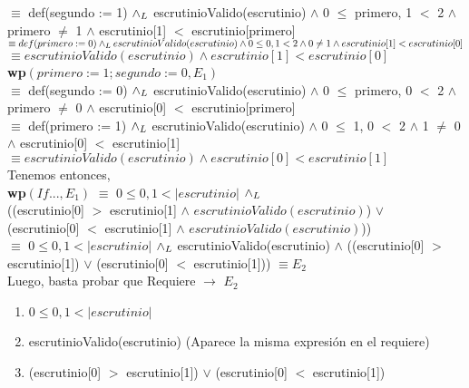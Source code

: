\documentclass[10pt,a4paper]{article}
\begin{document}
\noindent $\equiv$ def(segundo := 1) $\land _L$ escrutinioValido(escrutinio) $\land$ 0 $\leq$ primero, 1 $<$ 2 $\land$ primero $\neq$ 1 $\land$ escrutinio[1] $<$ escrutinio[primero] \\
\noindent $\equiv def(primero := 0) \land _L escrutinioValido(escrutinio) \land 0 \leq 0, 1 < 2 \land 0 \neq 1 \land escrutinio[1] < escrutinio[0] $ \\
\noindent $\equiv escrutinioValido(escrutinio) \land escrutinio[1] < escrutinio[0] $ \\

 \noindent \textbf{wp$(primero := 1; segundo := 0, E_1)$} \vspace{0.1cm} \\

\noindent $\equiv$ def(segundo := 0) $\land _L$ escrutinioValido(escrutinio) $\land$ 0 $\leq$ primero, 0 $<$ 2 $\land$ primero $\neq$ 0 $\land$ escrutinio[0] $<$ escrutinio[primero] \\
\noindent $\equiv$ def(primero := 1) $\land _L$ escrutinioValido(escrutinio) $\land$ 0 $\leq$ 1, 0 $<$ 2 $\land$ 1 $\neq$ 0 $\land$ escrutinio[0] $<$ escrutinio[1]  \\
\noindent $\equiv escrutinioValido(escrutinio) \land escrutinio[0] < escrutinio[1] $ \\

\noindent Tenemos entonces, \\

\noindent \textbf{wp$(If... , E_1)$}
\noindent $\equiv$ $0 \leq 0, 1 < |escrutinio|$ $\land _L$ \\  ((escrutinio[0] $>$ escrutinio[1]  $\land$ $escrutinioValido(escrutinio)$) $\lor$ \\
(escrutinio[0] $<$ escrutinio[1] $\land$ $escrutinioValido(escrutinio)$)) \\

\noindent $\equiv$ $0 \leq 0, 1 < |escrutinio|$ $\land _L$ escrutinioValido(escrutinio) $\land$ ((escrutinio[0] $>$ escrutinio[1]) $\lor$
(escrutinio[0] $<$ escrutinio[1])) $\equiv E_2$ \vspace{0.1cm} \\

\noindent Luego, basta probar que Requiere $\rightarrow$ $E_2$

\begin{enumerate}\setlength{\itemindent}{0.5cm}
		\item  $0 \leq 0, 1 < |escrutinio|$
		\item  escrutinioValido(escrutinio) (Aparece la misma expresión en el requiere)
		\item (escrutinio[0] $>$ escrutinio[1]) $\lor$ (escrutinio[0] $<$ escrutinio[1])
\end{enumerate}
\end{document}
